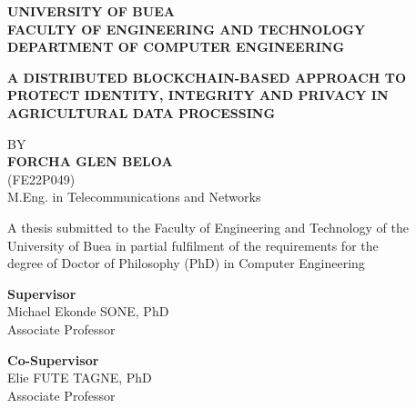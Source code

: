 \documentclass[12pt,a4paper,oneside]{book}
\begin{document}
\frontmatter
\pagestyle{fancy}

\thispagestyle{empty}
\begin{center}
\begin{singlespace}

{\fontsize{14}{17}\selectfont\bfseries UNIVERSITY OF BUEA}\\[0.4\baselineskip]
{\fontsize{14}{17}\selectfont\bfseries FACULTY OF ENGINEERING AND TECHNOLOGY}\\[0.3\baselineskip]
{\fontsize{14}{17}\selectfont\bfseries DEPARTMENT OF COMPUTER ENGINEERING}

\vspace{2.5\baselineskip}

{\fontsize{16}{19}\selectfont\bfseries
A DISTRIBUTED BLOCKCHAIN-BASED APPROACH TO PROTECT IDENTITY,
INTEGRITY AND PRIVACY IN AGRICULTURAL DATA PROCESSING}

\vspace{2.5\baselineskip}

{\fontsize{14}{17}\selectfont BY}\\[0.4\baselineskip]
{\fontsize{14}{17}\selectfont\bfseries FORCHA GLEN BELOA}\\[0.3\baselineskip]
{\fontsize{12}{14}\selectfont (FE22P049)}\\
{\fontsize{12}{14}\selectfont M.Eng. in Telecommunications and Networks}

\vspace{2\baselineskip}

{\fontsize{12}{14}\selectfont
A thesis submitted to the Faculty of Engineering and Technology of the\\
University of Buea in partial fulfilment of the requirements for the\\
degree of Doctor of Philosophy (PhD) in Computer Engineering}

\vspace{2.5\baselineskip}

{\fontsize{14}{17}\selectfont\bfseries Supervisor}\\[0.3\baselineskip]
{\fontsize{12}{14}\selectfont Michael Ekonde SONE, PhD\\ Associate Professor}

\vspace{1.2\baselineskip}

{\fontsize{14}{17}\selectfont\bfseries Co-Supervisor}\\[0.3\baselineskip]
{\fontsize{12}{14}\selectfont Elie FUTE TAGNE, PhD\\ Associate Professor}

\vfill

{\fontsize{14}{17}\selectfont\bfseries \monthyear}

\end{singlespace}
\end{center}
\clearpage
 
\end{document}
